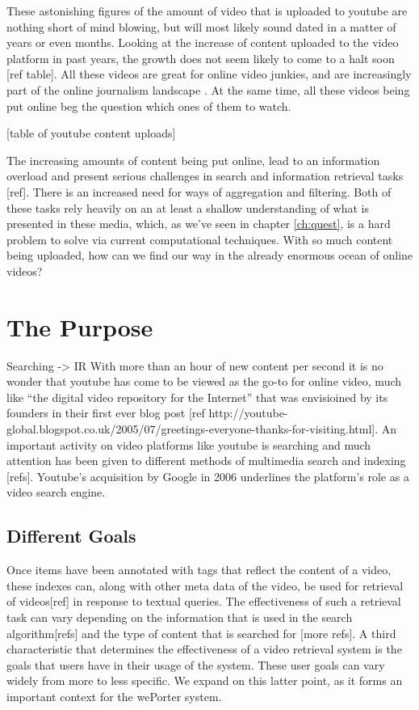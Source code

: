 These astonishing figures of the amount of video that is uploaded to youtube are nothing short of mind blowing, but will most likely sound dated in a matter of years or even months. Looking at the increase of content uploaded to the video platform in past years, the growth does not seem likely to come to a halt soon [ref table]. All these videos are great for online video junkies, and are increasingly part of the online journalism landscape \cite{Rosenstiel:2012vb}. At the same time, all these videos being put online beg the question which ones of them to watch.

[table of youtube content uploads]

The increasing amounts of content being put online, lead to an information overload and present serious challenges in search and information retrieval tasks [ref]. There is an increased need for ways of aggregation and filtering. Both of these tasks rely heavily on an at least a shallow understanding of what is presented in these media, which, as we've seen in chapter \ref{ch:quest}, is a hard problem to solve via current computational techniques. With so much content being uploaded, how can we find our way in the already enormous ocean of online videos?

\section{The Purpose}

Searching -> IR
With more than an hour of new content per second it is no wonder that youtube has come to be viewed as the go-to for online video, much like ``the digital video repository for the Internet'' that was envisioined by its founders in their first ever blog post [ref http://youtube-global.blogspot.co.uk/2005/07/greetings-everyone-thanks-for-visiting.html]. An important activity on video platforms like youtube is searching and much attention has been given to different methods of multimedia search and indexing [refs]. Youtube's acquisition by Google in 2006 underlines the platform's role as a video search engine. 


\subsection{Different Goals}
Once items have been annotated with tags that reflect the content of a video, these indexes can, along with other meta data of the video, be used for retrieval of videos[ref] in response to textual queries. The effectiveness of such a retrieval task can vary depending on the information that is used in the search algorithm[refs] and the type of content that is searched for \cite{Hollink:2005ei}[more refs]. A third characteristic that determines the effectiveness of a video retrieval system is the goals that users have in their usage of the system. These user goals can vary widely from more to less specific\cite{Davidson:2010tu}. We expand on this latter point, as it forms an important context for the wePorter system.

